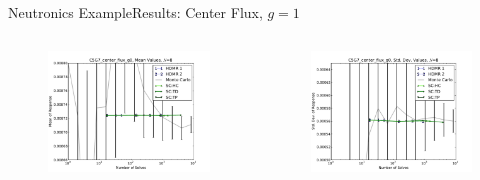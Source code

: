 \documentclass{beamer}
\begin{document}
\begin{frame}{Neutronics Example}{Results: Center Flux, $g=1$}%
  \begin{columns}
    \begin{column}{0.5\textwidth}
      \begin{figure}
        \centering
        \includegraphics[width=\linewidth]{c5g7/C5G7_center_flux_g0_mean_vals}
      \end{figure}
    \end{column}
    \begin{column}{0.5\textwidth}
      \begin{figure}
        \centering
        \includegraphics[width=\linewidth]{c5g7/C5G7_center_flux_g0_var_vals}
      \end{figure}
    \end{column}
  \end{columns}
\end{frame}
\end{document}
